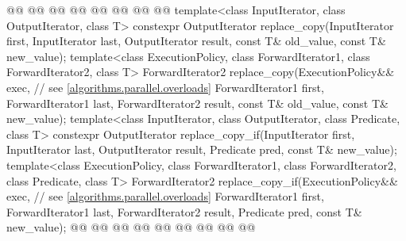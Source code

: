 \begin{codeblock}
{      @@
      @@
    @@
        @@
      @@
      @@
        @@
  @\added{\}}@
  template<class InputIterator, class OutputIterator, class T>
    constexpr OutputIterator replace_copy(InputIterator first, InputIterator last,
                                          OutputIterator result,
                                          const T& old_value, const T& new_value);
  template<class ExecutionPolicy, class ForwardIterator1, class ForwardIterator2, class T>
    ForwardIterator2 replace_copy(ExecutionPolicy&& exec, // see \ref{algorithms.parallel.overloads}
                                  ForwardIterator1 first, ForwardIterator1 last,
                                  ForwardIterator2 result,
                                  const T& old_value, const T& new_value);
  template<class InputIterator, class OutputIterator, class Predicate, class T>
    constexpr OutputIterator replace_copy_if(InputIterator first, InputIterator last,
                                             OutputIterator result,
                                             Predicate pred, const T& new_value);
  template<class ExecutionPolicy, class ForwardIterator1, class ForwardIterator2,
           class Predicate, class T>
    ForwardIterator2 replace_copy_if(ExecutionPolicy&& exec, // see \ref{algorithms.parallel.overloads}
                                     ForwardIterator1 first, ForwardIterator1 last,
                                     ForwardIterator2 result,
                                     Predicate pred, const T& new_value);
  @@
    @@
        @@
      @@
        @@
      @@
        @@
                    @@
    @@
}
\end{codeblock}

